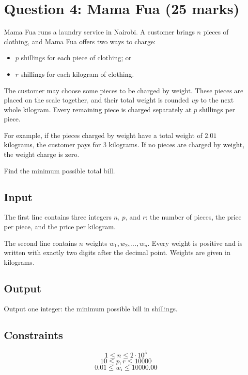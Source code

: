 \documentclass[a4paper,12pt]{article}
\begin{document}
\fi

\section*{Question 4: Mama Fua (25 marks)}

Mama Fua runs a laundry service in Nairobi. A customer brings \(n\) pieces
of clothing, and Mama Fua offers two ways to charge:

\begin{itemize}
    \item \(p\) shillings for each piece of clothing; or
    \item \(r\) shillings for each kilogram of clothing.
\end{itemize}

The customer may choose some pieces to be charged by weight. These pieces
are placed on the scale together, and their total weight is rounded
\emph{up} to the next whole kilogram. Every remaining piece is charged
separately at \(p\) shillings per piece.

For example, if the pieces charged by weight have a total weight of
\(2.01\) kilograms, the customer pays for \(3\) kilograms. If no pieces are
charged by weight, the weight charge is zero.

Find the minimum possible total bill.

\subsection*{Input}

The first line contains three integers \(n\), \(p\), and \(r\): the number
of pieces, the price per piece, and the price per kilogram.

The second line contains \(n\) weights \(w_1,w_2,\ldots,w_n\). Every weight
is positive and is written with exactly two digits after the decimal point.
Weights are given in kilograms.

\subsection*{Output}

Output one integer: the minimum possible bill in shillings.

\subsection*{Constraints}

\[
1\le n\le2\cdot10^5
\]
\[
10\le p,r\le10000
\]
\[
0.01\le w_i\le10000.00
\]
\end{document}

